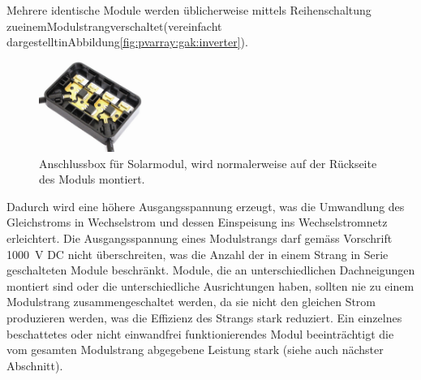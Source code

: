 Mehrere  identische  Module  werden  \"ublicherweise  mittels  Reihenschaltung
zu\hfill  einem\hfill  Modulstrang\hfill verschaltet\hfill  (vereinfacht\hfill
dargestellt\hfill in\hfill Abbildung\hfill \ref{fig:pvarray:gak:inverter}).

\begin{figure}
    \centering
    \includegraphics[width=0.3\textwidth]{images/solar-facility/pvJunctionBox.jpeg}
    \caption{
        Anschlussbox f\"ur Solarmodul, wird  normalerweise auf der R\"uckseite
        des Moduls montiert. \cite{ref:junctionBox}%
    }
    \label{fig:pvJunctionBox}
\end{figure}

\noindent  Dadurch  wird  eine  h\"ohere  Ausgangsspannung  erzeugt,  was  die
Umwandlung  des  Gleichstroms  in  Wechselstrom  und  dessen  Einspeisung  ins
Wechselstromnetz  erleichtert. Die  Ausgangsspannung eines  Modulstrangs  darf
gem\"ass Vorschrift \SI{1000}{\volt} DC  nicht \"uberschreiten, was die Anzahl
der in  einem Strang in  Serie geschalteten Module beschr\"ankt.   Module, die
an  unterschiedlichen Dachneigungen  montiert sind  oder die  unterschiedliche
Ausrichtungen  haben,  sollten  nie zu  einem  Modulstrang  zusammengeschaltet
werden, da sie nicht den gleichen  Strom produzieren werden, was die Effizienz
des Strangs stark reduziert. Ein einzelnes beschattetes oder nicht einwandfrei
funktionierendes   Modul  beeintr\"achtigt   die   vom  gesamten   Modulstrang
abgegebene Leistung stark (siehe auch n\"achster Abschnitt).


